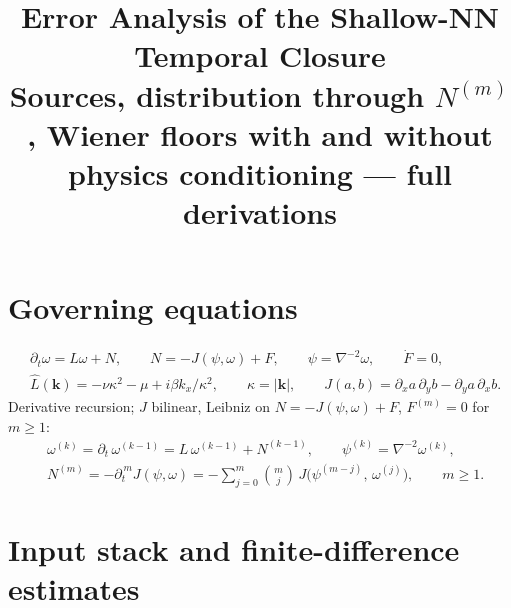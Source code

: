 \documentclass[11pt]{article}
\title{Error Analysis of the Shallow-NN Temporal Closure\\
\large Sources, distribution through $N^{(m)}$, Wiener floors with and without
physics conditioning --- full derivations}
\author{}
\date{}
\begin{document}
\maketitle

\section{Governing equations}

\begin{align}
&\partial_t\omega = L\omega + N,\qquad N = -J(\psi,\omega)+F,\qquad
\psi = \nabla^{-2}\omega,\qquad \dot F = 0,\\
&\hat L(\mathbf{k}) = -\nu\kappa^2-\mu + i\beta k_x/\kappa^2,\qquad
\kappa=|\mathbf{k}|,\qquad
J(a,b)=\partial_x a\,\partial_y b-\partial_y a\,\partial_x b.
\end{align}
Derivative recursion; $J$ bilinear, Leibniz on $N=-J(\psi,\omega)+F$,
$F^{(m)}=0$ for $m\ge1$:
\begin{align}
&\omega^{(k)} = \partial_t\,\omega^{(k-1)} = L\,\omega^{(k-1)}+N^{(k-1)},
\qquad \psi^{(k)}=\nabla^{-2}\omega^{(k)},\\
&N^{(m)} = -\partial_t^{\,m} J(\psi,\omega)
= -\sum_{j=0}^{m}\binom{m}{j}\,
J\!\bigl(\psi^{(m-j)},\,\omega^{(j)}\bigr),\qquad m\ge1.
\end{align}

\section{Input stack and finite-difference estimates}
\end{document}
